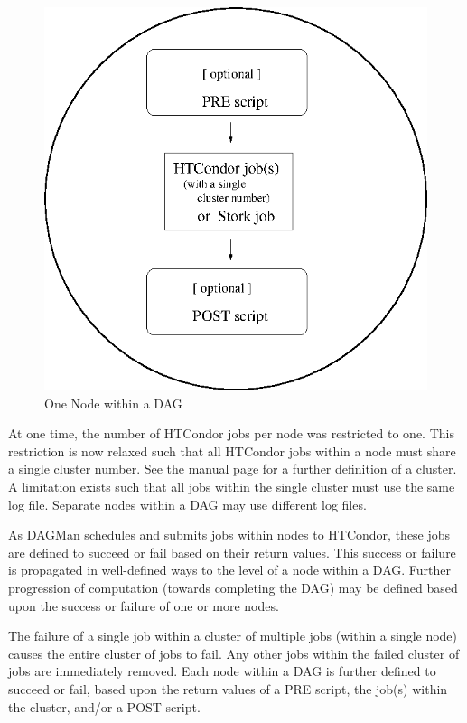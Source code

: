\begin{figure}[hbt]
\centering
\includegraphics{user-man/dagman-node.eps}
\caption{\label{fig:dagman-node}One Node within a DAG}
\end{figure}

At one time,
the number of HTCondor jobs per node was restricted to one.
This restriction is now relaxed such that all HTCondor jobs
within a node must share a single cluster number.
See the
 manual page
for a further definition of a cluster.
A limitation exists such that
all jobs within the single cluster must use the same log file.
Separate nodes within a DAG may use different log files.

As DAGMan schedules and submits jobs within nodes to HTCondor,
these jobs are defined to succeed or fail based on their
return values.
This success or failure is propagated in well-defined ways to the level of
a node within a DAG.
Further progression of computation
(towards completing the DAG)
may be defined based upon the success or failure of one or more nodes.

The failure of a single job within a cluster
of multiple jobs
(within a single node)
causes the entire cluster of jobs to fail.
Any other jobs within the failed cluster of jobs are
immediately removed.
Each node within a DAG is further defined to succeed or fail,
based upon the return values of a PRE script, the job(s)
within the cluster, and/or a POST script.

